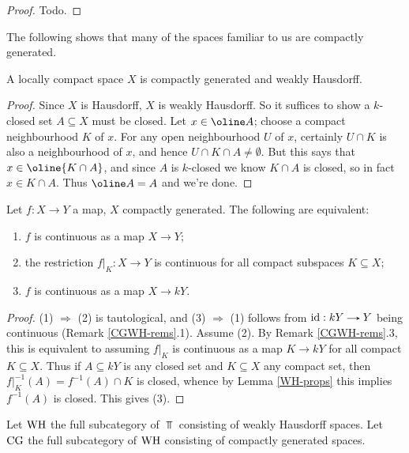 \begin{proof}
  Todo.
\end{proof}

The following shows that many of the spaces familiar to us are
compactly generated.

\begin{lemma}
  A locally compact space $X$ is compactly generated and weakly
  Hausdorff.
\end{lemma}

\begin{proof}
  Since $X$ is Hausdorff, $X$ is weakly Hausdorff. So it suffices to
  show a $k$-closed set $A \subseteq X$ must be closed. Let $x \in
  \oline A$; choose a compact neighbourhood $K$ of $x$. For any open
  neighbourhood $U$ of $x$, certainly $U \cap K$ is also a
  neighbourhood of $x$, and hence $U \cap K \cap A \ne \emptyset$. But
  this says that $x \in \oline{K \cap A}$, and since $A$ is $k$-closed
  we know $K \cap A$ is closed, so in fact $x \in K \cap A$. Thus
  $\oline A = A$ and we're done.
\end{proof}

\begin{lemma}
  \label{C-CG-map}
  Let $f : X \to Y$ a map, $X$ compactly generated. The following are
  equivalent:
  \begin{enumerate}
  \item $f$ is continuous as a map $X \to Y$;
  \item the restriction $f|_K : X \to Y$ is continuous for all compact
    subspaces $K \subseteq X$;
  \item $f$ is continuous as a map $X \to kY$.
  \end{enumerate}
\end{lemma}

\begin{proof}
  (1) $\Rightarrow$ (2) is tautological, and (3) $\Rightarrow$ (1)
  follows from $\id : kY \to Y$ being continuous (Remark
  \ref{CGWH-rems}.1). Assume (2). By Remark \ref{CGWH-rems}.3, this is
  equivalent to assuming $f|_K$ is continuous as a map $K \to kY$ for
  all compact $K \subseteq X$. Thus if $A \subseteq kY$ is any closed
  set and $K \subseteq X$ any compact set, then $f|_K^{-1}(A) =
  f^{-1}(A) \cap K$ is closed, whence by Lemma \ref{WH-props} this
  implies $f^{-1}(A)$ is closed. This gives (3).
\end{proof}

\begin{definition}
  Let $\mathrm{WH}$ the full subcategory of $\Top$ consisting of weakly
  Hausdorff spaces. Let $\mathrm{CG}$ the full subcategory of $\mathrm{WH}$ consisting
  of compactly generated spaces.
\end{definition}

